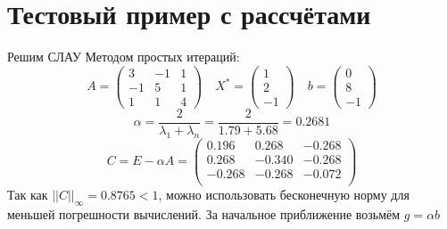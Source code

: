 \documentclass[11pt,a4paper]{article}
\renewcommand\;{\hspace{1cm}}
\begin{document}
\section{Тестовый пример с рассчётами}
Решим СЛАУ Методом простых итераций: \[
  A = \begin{pmatrix}
    3 & -1 & 1\\
    -1 & 5 & 1\\
    1 & 1 & 4
  \end{pmatrix} \quad X^{*} = \begin{pmatrix}
    1 \\ 2 \\ -1
  \end{pmatrix} \quad b = \begin{pmatrix}
    0 \\ 8 \\ -1
  \end{pmatrix}
\]
\[
  \alpha = \frac{2}{\lambda_{1} + \lambda_{n}} = \frac{2}{1.79 + 5.68} = 0.2681
\]\[
  C = E - \alpha A = \begin{pmatrix}
    0.196 & 0.268 & -0.268\\
    0.268 & -0.340 & -0.268\\
    -0.268 & -0.268 & -0.072\\
  \end{pmatrix}
\]
Так как $||C||_{\infty} = 0.8765 < 1$, можно использовать бесконечную норму для меньшей погрешности вычислений.
За начальное приближение возьмём $g = \alpha b$
\end{document}
